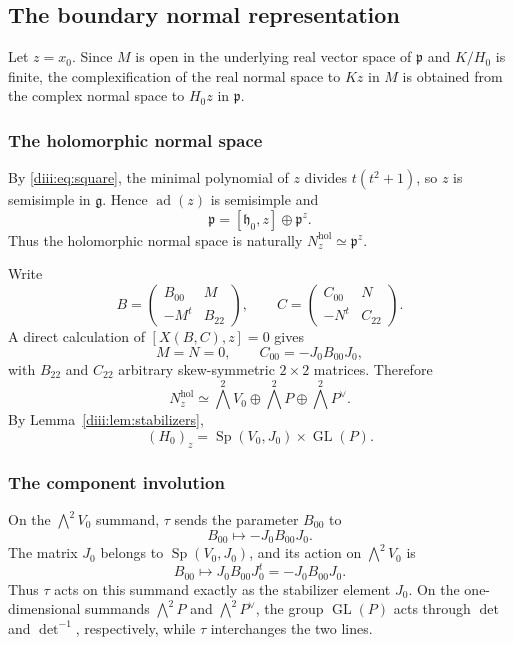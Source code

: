 \documentclass[11pt,reqno]{amsart}
\numberwithin{equation}{section}
\theoremstyle{definition}
\theoremstyle{remark}
\newcommand{\GL}{\operatorname{GL}}
\newcommand{\Sp}{\operatorname{Sp}}
\newcommand{\fg}{\mathfrak g}
\newcommand{\fh}{\mathfrak h}
\newcommand{\fp}{\mathfrak p}
\newcommand{\wedgeTwo}{\bigwedge^{2}}
\begin{document}
\subsection{The boundary normal representation}

Let $z=x_0$.  Since $M$ is open in the underlying real vector space of $\fp$ and $K/H_0$ is finite, the complexification of the real normal space to $Kz$ in $M$ is obtained from the complex normal space to $H_0z$ in $\fp$.

\subsubsection{The holomorphic normal space}

By \eqref{diii:eq:square}, the minimal polynomial of $z$ divides
$t(t^2+1)$, so $z$ is semisimple in $\fg$.  Hence $\operatorname{ad}(z)$ is semisimple and
\begin{equation}\label{diii:eq:normal-centralizer}
  \fp=[\fh_0,z]\oplus\fp^z.
\end{equation}
Thus the holomorphic normal space is naturally
$N_z^{\mathrm{hol}}\simeq\fp^z$.

Write
\[
 B=\begin{pmatrix}B_{00}&M\\-M^t&B_{22}\end{pmatrix},
 \qquad
 C=\begin{pmatrix}C_{00}&N\\-N^t&C_{22}\end{pmatrix}.
\]
A direct calculation of $[X(B,C),z]=0$ gives
\[
  M=N=0,
  \qquad
  C_{00}=-J_0B_{00}J_0,
\]
with $B_{22}$ and $C_{22}$ arbitrary skew-symmetric $2\times2$ matrices.  Therefore
\begin{equation}\label{diii:eq:Nhol}
  N_z^{\mathrm{hol}}
  \simeq
  \wedgeTwo V_0\oplus\wedgeTwo P\oplus\wedgeTwo P^\vee.
\end{equation}
By Lemma~\ref{diii:lem:stabilizers},
\[
  (H_0)_z=\Sp(V_0,J_0)\times\GL(P).
\]

\subsubsection{The component involution}

On the $\wedgeTwo V_0$ summand, $\tau$ sends the parameter $B_{00}$ to
\begin{equation}\label{diii:eq:tauV0}
  B_{00}\longmapsto -J_0B_{00}J_0.
\end{equation}
The matrix $J_0$ belongs to $\Sp(V_0,J_0)$, and its action on
$\wedgeTwo V_0$ is
\[
  B_{00}\longmapsto J_0B_{00}J_0^t=-J_0B_{00}J_0.
\]
Thus $\tau$ acts on this summand exactly as the stabilizer element $J_0$.
On the one-dimensional summands $\wedgeTwo P$ and $\wedgeTwo P^\vee$, the group $\GL(P)$ acts through $\det$ and $\det^{-1}$, respectively, while $\tau$ interchanges the two lines.
\end{document}
